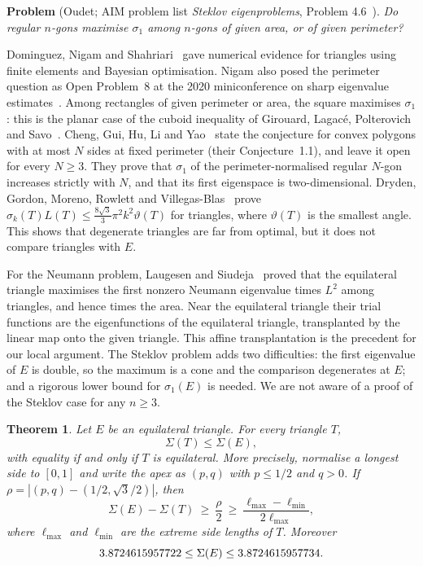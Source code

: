 \documentclass[11pt]{article}
\newtheorem{theorem}{Theorem}[section]
\theoremstyle{definition}
\theoremstyle{remark}
\begin{document}
\medskip\noindent\textbf{Problem} (Oudet; AIM problem list \emph{Steklov eigenproblems}, Problem 4.6~\cite{AimPL}).
\emph{Do regular $n$-gons maximise $\sigma_1$ among $n$-gons of given area, or of given perimeter?}

\medskip
Dominguez, Nigam and Shahriari~\cite{DNS} gave numerical evidence for triangles using finite elements and
Bayesian optimisation. Nigam also posed the perimeter question as Open Problem~8 at the
2020 miniconference on sharp eigenvalue estimates~\cite{Nigam}. Among rectangles of given perimeter or area, the square maximises $\sigma_1$:
this is the planar case of the cuboid inequality of Girouard, Lagac\'e, Polterovich and
Savo~\cite[Thm.~1.6]{GLPS}. Cheng, Gui, Hu, Li and Yao~\cite{CGHLY} state the conjecture for convex polygons
with at most $N$ sides at fixed perimeter (their Conjecture~1.1), and leave it open for every $N\ge3$. They
prove that $\sigma_1$ of the perimeter-normalised regular $N$-gon increases strictly with $N$, and that its
first eigenspace is two-dimensional. Dryden, Gordon, Moreno, Rowlett and Villegas-Blas~\cite{DGMRV} prove
$\sigma_k(T)L(T)\le\frac{8\sqrt3}{3}\pi^2k^2\vartheta(T)$ for triangles, where $\vartheta(T)$ is the smallest
angle. This shows that degenerate triangles are far from optimal, but it does not compare triangles with $E$.

For the Neumann problem, Laugesen and Siudeja~\cite{LS} proved that the equilateral triangle maximises
the first nonzero Neumann eigenvalue times $L^2$ among triangles, and hence times the area. Near the
equilateral triangle their trial functions are the eigenfunctions of the equilateral triangle, transplanted
by the linear map onto the given triangle. This affine transplantation is the precedent for our local
argument. The Steklov problem adds two difficulties: the first eigenvalue of $E$ is double, so the maximum
is a cone and the comparison degenerates at $E$; and a rigorous lower bound for $\sigma_1(E)$ is needed. We are
not aware of a proof of the Steklov case for any $n\ge3$.

\begin{theorem}\label{thm:main}
Let $E$ be an equilateral triangle. For every triangle $T$,
\[\Sigma(T)\le\Sigma(E),\]
with equality if and only if $T$ is equilateral. More precisely, normalise a longest side to $[0,1]$ and
write the apex as $(p,q)$ with $p\le1/2$ and $q>0$. If $\rho=|(p,q)-(1/2,\sqrt3/2)|$, then
\[
\Sigma(E)-\Sigma(T)\ \ge\ \frac{\rho}{2}\ \ge\
\frac{\ell_{\max}-\ell_{\min}}{2\ell_{\max}},
\]
where $\ell_{\max}$ and $\ell_{\min}$ are the extreme side lengths of $T$. Moreover
\[3.8724615957722\le\Sigma(E)\le3.8724615957734 .\]
\end{theorem}
\end{document}
